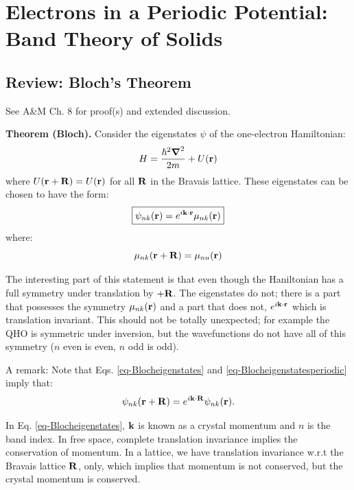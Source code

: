 \section{Electrons in a Periodic Potential: Band Theory of Solids}

\subsection{Review: Bloch's Theorem}
See A\&M Ch. 8 for proof(s) and extended discussion.

\textbf{Theorem (Bloch).} Consider the eigenstates $\psi$ of the one-electron Hamiltonian:
\begin{align*}
    H = \frac{\hbar^2\nabla^2}{2m} + U(\v{r})
\end{align*}
where $U(\mathbf{r} + \mathbf{R}) = U(\mathbf{r})$ for all $\mathbf{R}$ in the Bravais lattice. These eigenstates can be chosen to have the form:
\begin{equation}\label{eq-Blocheigenstates}
    \boxed{\psi_{nk}(\mathbf{r}) = e^{i\mathbf{k}\cdot \mathbf{r}}\mu_{nk}(\mathbf{r})}
\end{equation}
where:
\begin{equation}\label{eq-Blocheigenstatesperiodic}
    \mu_{nk}(\mathbf{r} + \mathbf{R}) = \mu_{nu}(\mathbf{r})
\end{equation} 

The interesting part of this statement is that even though the Haniltonian has a full symmetry under translation by $+ \mathbf{R}$. The eigenstates do not; there is a part that possesses the symmetry $\mu_{nk}(\mathbf{r})$ and a part that does not, $e^{i\mathbf{k} \cdot \mathbf{r}}$ which is translation invariant. This should not be totally unexpected; for example the QHO is symmetric under inversion, but the wavefunctions do not have all of this symmetry ($n$ even is even, $n$ odd is odd).

A remark: Note that Eqs. \eqref{eq-Blocheigenstates} and \eqref{eq-Blocheigenstatesperiodic} imply that:
\begin{equation}
    \psi_{nk}(\mathbf{r} + \mathbf{R}) = e^{i\mathbf{k} \cdot \mathbf{R}}\psi_{nk}(\mathbf{r}).
\end{equation}

In Eq. \eqref{eq-Blocheigenstates}, $\mathbf{k}$ is known as a crystal momentum and $n$ is the band index. In free space, complete translation invariance implies the conservation of momentum. In a lattice, we have translation invariance w.r.t the Bravais lattice $\mathbf{R}$, only, which implies that momentum is not conserved, but the crystal momentum is conserved.

